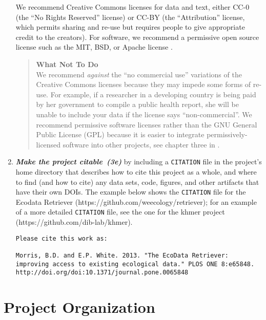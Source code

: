 \documentclass[10pt,letterpaper]{article}
\newcommand{\withurl}[2]{{#1}}
\newcommand{\practicesection}[2]{\section{#1}\label{#2}}
\newcommand{\practice}[2]{\textbf{\emph{{#2}~({#1})}}}
\begin{document}
\begin{enumerate}
  We recommend Creative Commons licenses for data and text, either
  \withurl{CC-0}{https://creativecommons.org/about/cc0/} (the ``No
  Rights Reserved'' license) or
  \withurl{CC-BY}{https://creativecommons.org/licenses/by/4.0/} (the
  ``Attribution'' license, which permits sharing and re-use but
  requires people to give appropriate credit to the creators).  For
  software, we recommend a permissive open source license such as the
  MIT, BSD, or Apache license \cite{laurent2004}.

  \begin{quote}
    \noindent \textbf{What Not To Do}
    \\
    We recommend \emph{against} the ``no commercial use'' variations
    of the Creative Commons licenses because they may impede some
    forms of re-use.  For example, if a researcher in a developing
    country is being paid by her government to compile a public health
    report, she will be unable to include your data if the license
    says ``non-commercial''. We recommend permissive software licenses
    rather than the GNU General Public License (GPL) because it is
    easier to integrate permissively-licensed software into other
    projects, see chapter three in \cite{laurent2004}.
  \end{quote}

\item

  \practice{3e}{Make the project citable} by including a
  \texttt{CITATION} file in the project's home directory that
  describes how to cite this project as a whole, and where to find
  (and how to cite) any data sets, code, figures, and other artifacts
  that have their own DOIs.  The example below shows the
  \texttt{CITATION} file for the Ecodata
  Retriever (https://github.com/weecology/retriever); for an example
  of a more detailed \texttt{CITATION} file, see the one for the khmer
  project (https://github.com/dib-lab/khmer).

{\small
\begin{verbatim}
Please cite this work as:

Morris, B.D. and E.P. White. 2013. "The EcoData Retriever:
improving access to existing ecological data." PLOS ONE 8:e65848.
http://doi.org/doi:10.1371/journal.pone.0065848
\end{verbatim}
}

\end{enumerate}

\practicesection{Project Organization}{sec:project}
\end{document}
